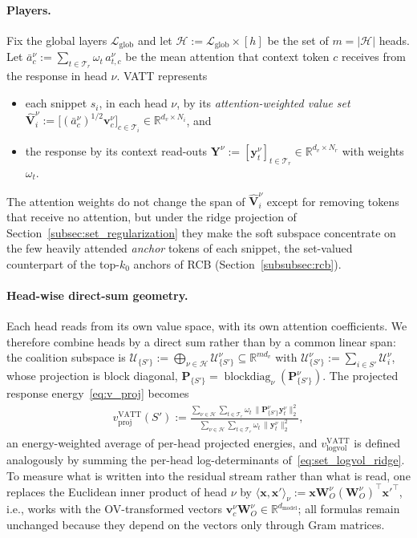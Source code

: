 \documentclass{article}
\begin{document}
\paragraph{Players.}
Fix the global layers $\mathcal{L}_{\text{glob}}$ and let $\mathcal{H} := \mathcal{L}_{\text{glob}} \times [h]$ be the set of $m = |\mathcal{H}|$ heads. Let $\bar{a}^{\nu}_c := \sum_{t \in \mathcal{T}_r} \omega_t \, a^{\nu}_{t,c}$ be the mean attention that context token $c$ receives from the response in head $\nu$. VATT represents
\begin{itemize}
    \item each snippet $s_i$, in each head $\nu$, by its \emph{attention-weighted value set} $\hat{\mathbf{V}}^{\nu}_i := \big[ (\bar{a}^{\nu}_c)^{1/2} \mathbf{v}^{\nu}_c \big]_{c \in \mathcal{T}_i} \in \mathbb{R}^{d_v \times N_i}$, and
    \item the response by its context read-outs $\mathbf{Y}^{\nu} := [\mathbf{y}^{\nu}_t]_{t \in \mathcal{T}_r} \in \mathbb{R}^{d_v \times N_r}$ with weights $\omega_t$.
\end{itemize}
The attention weights do not change the span of $\hat{\mathbf{V}}^\nu_i$ except for removing tokens that receive no attention, but under the ridge projection of Section~\ref{subsec:set_regularization} they make the soft subspace concentrate on the few heavily attended \emph{anchor} tokens of each snippet, the set-valued counterpart of the top-$k_0$ anchors of RCB (Section~\ref{subsubsec:rcb}).

\paragraph{Head-wise direct-sum geometry.}
Each head reads from its own value space, with its own attention coefficients. We therefore combine heads by a direct sum rather than by a common linear span: the coalition subspace is $\mathcal{U}_{\{S'\}} := \bigoplus_{\nu \in \mathcal{H}} \mathcal{U}^{\nu}_{\{S'\}} \subseteq \mathbb{R}^{m d_v}$ with $\mathcal{U}^\nu_{\{S'\}} := \sum_{i \in S'} \mathcal{U}^\nu_i$, whose projection is block diagonal, $\mathbf{P}_{\{S'\}} = \operatorname{blockdiag}_{\nu}(\mathbf{P}^{\nu}_{\{S'\}})$. The projected response energy~\eqref{eq:v_proj} becomes
\begin{align}\label{eq:vatt_proj}
    v^{\text{VATT}}_{\text{proj}}(S') := \frac{\sum_{\nu \in \mathcal{H}} \sum_{t \in \mathcal{T}_r} \omega_t \, \big\|\mathbf{P}^{\nu}_{\{S'\}} \mathbf{y}^{\nu}_t\big\|_2^2}{\sum_{\nu \in \mathcal{H}} \sum_{t \in \mathcal{T}_r} \omega_t \, \|\mathbf{y}^{\nu}_t\|_2^2},
\end{align}
an energy-weighted average of per-head projected energies, and $v^{\text{VATT}}_{\text{logvol}}$ is defined analogously by summing the per-head log-determinants of~\eqref{eq:set_logvol_ridge}. To measure what is written into the residual stream rather than what is read, one replaces the Euclidean inner product of head $\nu$ by $\langle \mathbf{x}, \mathbf{x}' \rangle_{\nu} := \mathbf{x} \mathbf{W}_O^{\nu} (\mathbf{W}_O^{\nu})^\top \mathbf{x}'^\top$, i.e., works with the OV-transformed vectors $\mathbf{v}^\nu_c \mathbf{W}_O^\nu \in \mathbb{R}^{d_{\text{model}}}$; all formulas remain unchanged because they depend on the vectors only through Gram matrices.
\end{document}
